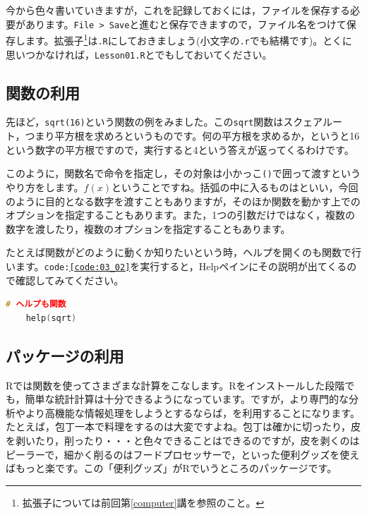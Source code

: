\documentclass{ltjsbook}
\begin{document}
今から色々書いていきますが，これを記録しておくには，ファイルを保存する必要があります。\verb|File > Save|と進むと保存できますので，ファイル名をつけて保存します。拡張子\footnote{拡張子については前回第\ref{computer}講を参照のこと。}は\texttt{.R}にしておきましょう(小文字の\texttt{.r}でも結構です)。とくに思いつかなければ，\texttt{Lesson01.R}とでもしておいてください。

\subsection{関数の利用}
先ほど，\texttt{sqrt(16)}という関数の例をみました。この\texttt{sqrt}関数はスクェアルート，つまり平方根を求めろというものです。何の平方根を求めるか，というと16という数字の平方根ですので，実行すると4という答えが返ってくるわけです。

このように，関数名で命令を指定し，その対象は小かっこ\verb|()|で囲って渡すというやり方をします。$f(x)$ということですね。括弧の中に入るものはといい，今回のように目的となる数字を渡すこともありますが，そのほか関数を動かす上でのオプションを指定することもあります。また，1つの引数だけではなく，複数の数字を渡したり，複数のオプションを指定することもあります。

たとえば関数がどのように動くか知りたいという時，ヘルプを開くのも関数で行います。\texttt{code:\ref{code:03_02}}を実行すると，Helpペインにその説明が出てくるので確認してみてください。
\begin{lstlisting}[language=c++,label={code:03_02},caption={ヘルプのコード}]
	# ヘルプも関数
	help(sqrt)
\end{lstlisting}
\subsection{パッケージの利用}
\label{HowToUseRpackage}
Rでは関数を使ってさまざまな計算をこなします。Rをインストールした段階でも，簡単な統計計算は十分できるようになっています。ですが，より専門的な分析やより高機能な情報処理をしようとするならば，を利用することになります。たとえば，包丁一本で料理をするのは大変ですよね。包丁は確かに切ったり，皮を剥いたり，削ったり・・・と色々できることはできるのですが，皮を剥くのはピーラーで，細かく削るのはフードプロセッサーで，といった便利グッズを使えばもっと楽です。この「便利グッズ」がRでいうところのパッケージです。
\end{document}
